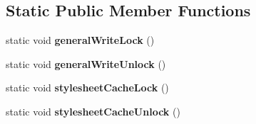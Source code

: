 \subsection*{\-Static \-Public \-Member \-Functions}
\begin{DoxyCompactItemize}
\item 
\hypertarget{classgeneral__server_1_1LibXmlBaseDoc_ab8a456ce99d02d4f450d66d126653153}{static void {\bfseries general\-Write\-Lock} ()}\label{classgeneral__server_1_1LibXmlBaseDoc_ab8a456ce99d02d4f450d66d126653153}

\item 
\hypertarget{classgeneral__server_1_1LibXmlBaseDoc_a3a5359f27a934483f48a4374bf1a9cb6}{static void {\bfseries general\-Write\-Unlock} ()}\label{classgeneral__server_1_1LibXmlBaseDoc_a3a5359f27a934483f48a4374bf1a9cb6}

\item 
\hypertarget{classgeneral__server_1_1LibXmlBaseDoc_a279185f32ba0aca40600c6f20618e2f1}{static void {\bfseries stylesheet\-Cache\-Lock} ()}\label{classgeneral__server_1_1LibXmlBaseDoc_a279185f32ba0aca40600c6f20618e2f1}

\item 
\hypertarget{classgeneral__server_1_1LibXmlBaseDoc_a8ccffd1adb268e1fa9776b5a5216b3f3}{static void {\bfseries stylesheet\-Cache\-Unlock} ()}\label{classgeneral__server_1_1LibXmlBaseDoc_a8ccffd1adb268e1fa9776b5a5216b3f3}

\end{DoxyCompactItemize}
